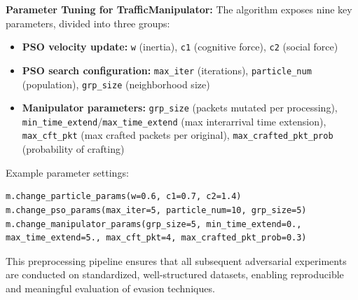 \textbf{Parameter Tuning for TrafficManipulator:} The algorithm exposes nine key parameters, divided into three groups:
\begin{itemize}
    \item \textbf{PSO velocity update:} \texttt{w} (inertia), \texttt{c1} (cognitive force), \texttt{c2} (social force)
    \item \textbf{PSO search configuration:} \texttt{max\_iter} (iterations), \texttt{particle\_num} (population), \texttt{grp\_size} (neighborhood size)
    \item \textbf{Manipulator parameters:} \texttt{grp\_size} (packets mutated per processing), \texttt{min\_time\_extend}/\texttt{max\_time\_extend} (max interarrival time extension), \texttt{max\_cft\_pkt} (max crafted packets per original), \texttt{max\_crafted\_pkt\_prob} (probability of crafting)
\end{itemize}
Example parameter settings:
\begin{verbatim}
m.change_particle_params(w=0.6, c1=0.7, c2=1.4)
m.change_pso_params(max_iter=5, particle_num=10, grp_size=5)
m.change_manipulator_params(grp_size=5, min_time_extend=0., max_time_extend=5., max_cft_pkt=4, max_crafted_pkt_prob=0.3)
\end{verbatim}

This preprocessing pipeline ensures that all subsequent adversarial experiments are conducted on standardized, well-structured datasets, enabling reproducible and meaningful evaluation of evasion techniques.

